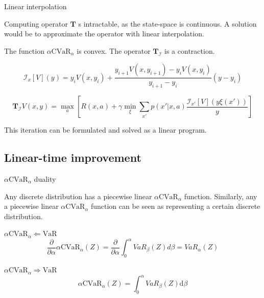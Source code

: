 \documentclass{beamer}
\newcommand{\cvar}{\text{CVaR}}
\newcommand{\var}{\text{VaR}}
\newcommand{\bsquare}[1]{\left[ {#1} \right]}
\newcommand{\interpI}{\mathcal{I}}
\newcommand{\dt}{\text{d}}
\begin{document}
\begin{frame}{Linear interpolation}

Computing operator $\mathbf{T}$ s intractable, as the state-space is continuous. A solution would be to approximate the operator with linear interpolation.

\begin{theorem}
The function $\alpha\cvar_\alpha$ is convex. The operator $\mathbf{T}_\interpI$ is a contraction.

$$\interpI_{x}[V](y)=y_iV(x,y_{i})+\frac{y_{i+1}V(x,y_{i+1})-y_iV(x,y_{i})}{y_{i+1}-y_i}(y-y_i)$$

$$\mathbf{T}_\interpI V(x, y) = \max_a \bsquare{ R(x, a) + \gamma \min_{\xi} \sum_{x'} p(x'| x, a)\dfrac{\interpI_{x'} [V](y\xi(x'))}{y}}$$

\end{theorem}

This iteration can be formulated and solved as a linear program.

\end{frame}


\begin{frame}
\end{frame}



\subsection{Linear-time improvement}

\begin{frame}{$\alpha\cvar_\alpha$ duality}
\begin{lemma}
Any discrete distribution has a piecewise linear $\alpha\cvar_\alpha$ function. Similarly, any a piecewise linear $\alpha\cvar_\alpha$ function can be seen as representing a certain discrete distribution.
\end{lemma}

\begin{block}{$\alpha\cvar_\alpha 	\Leftarrow \var$}
$$\dfrac{\partial}{\partial \alpha} \alpha \cvar_\alpha(Z) = \dfrac{\partial}{\partial \alpha} \int_0^\alpha VaR_\beta(Z) d\beta = VaR_\alpha(Z)$$
\end{block}


\begin{block}{$\alpha\cvar_\alpha 	\Rightarrow \var$}
$$\alpha \cvar_\alpha(Z) = \int_0^\alpha VaR_\beta(Z) \dt \beta$$
\end{block}

\end{frame}
\end{document}

